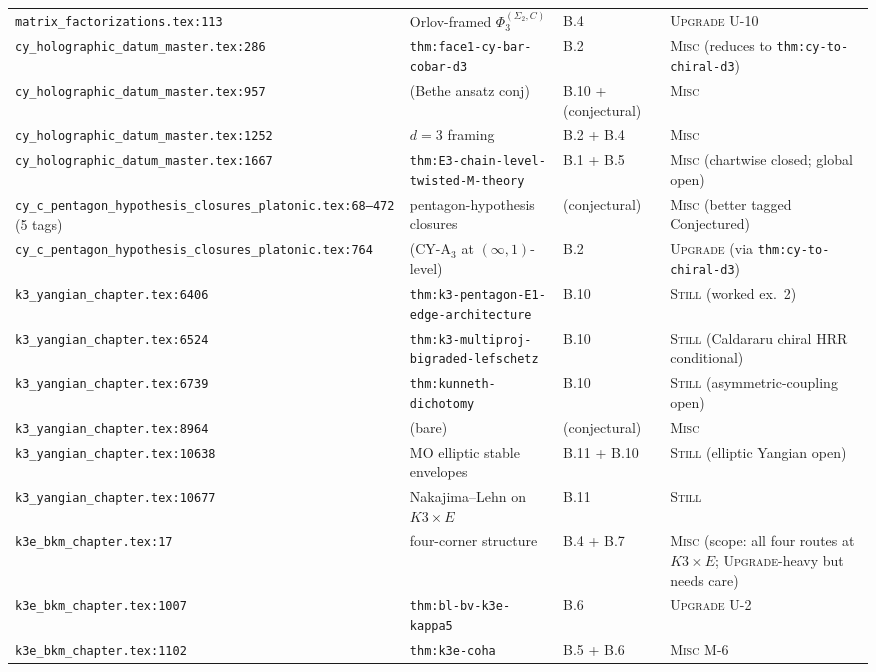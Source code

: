 \documentclass[11pt]{amsart}
\begin{document}
{{\begin{longtable}{@{}p{5.5cm}p{3cm}p{2cm}p{3.5cm}@{}}
\texttt{matrix\_factorizations.tex:113} & Orlov-framed $\Phi_3^{(\Sigma_2,C)}$ & B.4 & \textsc{Upgrade} U-10 \\
\texttt{cy\_holographic\_datum\_master.tex:286} & \texttt{thm:face1-cy-bar-cobar-d3} & B.2 & \textsc{Misc} (reduces to \texttt{thm:cy-to-chiral-d3}) \\
\texttt{cy\_holographic\_datum\_master.tex:957} & (Bethe ansatz conj) & B.10 + (conjectural) & \textsc{Misc} \\
\texttt{cy\_holographic\_datum\_master.tex:1252} & $d=3$ framing & B.2 + B.4 & \textsc{Misc} \\
\texttt{cy\_holographic\_datum\_master.tex:1667} & \texttt{thm:E3-chain-level-twisted-M-theory} & B.1 + B.5 & \textsc{Misc} (chartwise closed; global open) \\
\texttt{cy\_c\_pentagon\_hypothesis\_closures\_platonic.tex:68--472} (5 tags) & pentagon-hypothesis closures & (conjectural) & \textsc{Misc} (better tagged Conjectured) \\
\texttt{cy\_c\_pentagon\_hypothesis\_closures\_platonic.tex:764} & (CY-A$_3$ at $(\infty,1)$-level) & B.2 & \textsc{Upgrade} (via \texttt{thm:cy-to-chiral-d3}) \\
\texttt{k3\_yangian\_chapter.tex:6406} & \texttt{thm:k3-pentagon-E1-edge-architecture} & B.10 & \textsc{Still} (worked ex.\ 2) \\
\texttt{k3\_yangian\_chapter.tex:6524} & \texttt{thm:k3-multiproj-bigraded-lefschetz} & B.10 & \textsc{Still} (Caldararu chiral HRR conditional) \\
\texttt{k3\_yangian\_chapter.tex:6739} & \texttt{thm:kunneth-dichotomy} & B.10 & \textsc{Still} (asymmetric-coupling open) \\
\texttt{k3\_yangian\_chapter.tex:8964} & (bare) & (conjectural) & \textsc{Misc} \\
\texttt{k3\_yangian\_chapter.tex:10638} & MO elliptic stable envelopes & B.11 + B.10 & \textsc{Still} (elliptic Yangian open) \\
\texttt{k3\_yangian\_chapter.tex:10677} & Nakajima--Lehn on $K3 \times E$ & B.11 & \textsc{Still} \\
\texttt{k3e\_bkm\_chapter.tex:17} & four-corner structure & B.4 + B.7 & \textsc{Misc} (scope: all four routes at $K3 \times E$; \textsc{Upgrade}-heavy but needs care) \\
\texttt{k3e\_bkm\_chapter.tex:1007} & \texttt{thm:bl-bv-k3e-kappa5} & B.6 & \textsc{Upgrade} U-2 \\
\texttt{k3e\_bkm\_chapter.tex:1102} & \texttt{thm:k3e-coha} & B.5 + B.6 & \textsc{Misc} M-6 \\

\end{longtable}}}
\end{document}

